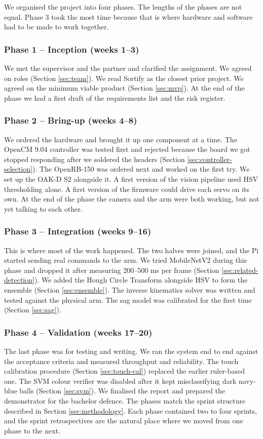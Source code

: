 \label{sec:development-phases}
We organised the project into four phases. The lengths of the phases
are not equal. Phase 3 took the most time because that is where
hardware and software had to be made to work together.
\subsubsection*{Phase 1 -- Inception (weeks 1--3)}
We met the supervisor and the partner and clarified the assignment.
We agreed on roles (Section \ref{sec:team}). We read  Sortify \cite{sortify} as the closest prior
project. We agreed on the minimum viable product
(Section \ref{sec:mvp}). At the end of the phase we had a first draft
of the requirements list and the risk register.
\subsubsection*{Phase 2 -- Bring-up (weeks 4--8)}
We ordered the hardware and brought it up one component at a time.
The OpenCM 9.04 controller was tested first and rejected because the
board we got stopped responding after we soldered the headers
(Section \ref{sec:controller-selection}). The OpenRB-150 was ordered
next and worked on the first try. We set up the OAK-D S2 alongside it.
A first version of the vision pipeline used HSV thresholding alone.
A first version of the firmware could drive each servo on its own.
At the end of the phase the camera and the arm were both working, but
not yet talking to each other.
\subsubsection*{Phase 3 -- Integration (weeks 9--16)}
This is where most of the work happened. The two halves were joined,
and the Pi started sending real commands to the arm. We tried
MobileNetV2 during this phase and dropped it after measuring 200--500
ms per frame (Section \ref{sec:related-detection}). We added the
Hough Circle Transform alongside HSV to form the ensemble
(Section \ref{sec:ensemble}). The inverse kinematics solver was
written and tested against the physical arm. The sag model was
calibrated for the first time (Section \ref{sec:sag}).
\subsubsection*{Phase 4 -- Validation (weeks 17--20)}
The last phase was for testing and writing. We ran the system end to
end against the acceptance criteria and measured throughput and
reliability. The touch calibration procedure
(Section \ref{sec:touch-cal}) replaced the earlier ruler-based one.
The SVM colour verifier was disabled after it kept misclassifying dark
navy-blue balls (Section \ref{sec:svm}). We finalised the report and
prepared the demonstrator for the bachelor defence.
The phases match the sprint structure described in
Section \ref{sec:methodology}. Each phase contained two to four
sprints, and the sprint retrospectives are the natural place where we
moved from one phase to the next.
